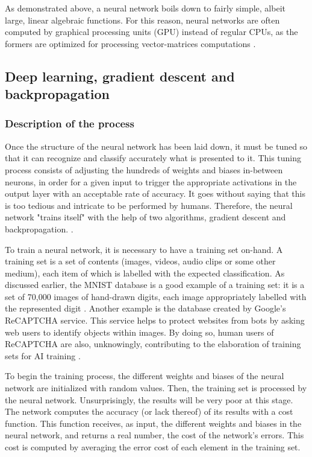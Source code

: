 \documentclass[12pt,a4paper,notitlepage]{article}
\begin{document}
As demonstrated above, a neural network boils down to fairly simple, albeit large, linear algebraic functions. For this reason, neural networks are often computed by graphical processing units (GPU) instead of regular CPUs, as the formers are optimized for processing vector-matrices computations \cite{salter_cart_2021}.

\subsection{Deep learning, gradient descent and backpropagation}
\subsubsection{Description of the process}
Once the structure of the neural network has been laid down, it must be tuned so that it can recognize and classify accurately what is presented to it. This tuning process consists of adjusting the hundreds of weights and biases in-between neurons, in order for a given input to trigger the appropriate activations in the output layer with an acceptable rate of accuracy. It goes without saying that this is too tedious and intricate to be performed by humans. Therefore, the neural network "trains itself" with the help of two algorithms, gradient descent and backpropagation. \cite{ibm_cloud_education_what_2020}.

To train a neural network, it is necessary to have a training set on-hand. A training set is a set of contents (images, videos, audio clips or some other medium), each item of which is labelled with the expected classification. As discussed earlier, the MNIST database is a good example of a training set: it is a set of 70,000 images of hand-drawn digits, each image appropriately labelled with the represented digit \cite{lecun_mnist_1998}. Another example is the database created by Google's ReCAPTCHA service. This service helps to protect websites from bots by asking web users to identify objects within images. By doing so, human users of ReCAPTCHA are also, unknowingly, contributing to the elaboration of training sets for AI training \cite{maruzani_are_2021}.

To begin the training process, the different weights and biases of the neural network are initialized with random values. Then, the training set is processed by the neural network. Unsurprisingly, the results will be very poor at this stage. The network computes the accuracy (or lack thereof) of its results with a cost function. This function receives, as input, the different weights and biases in the neural network, and returns a real number, the cost of the network's errors. This cost is computed by averaging the error cost of each element in the training set.
\end{document}
